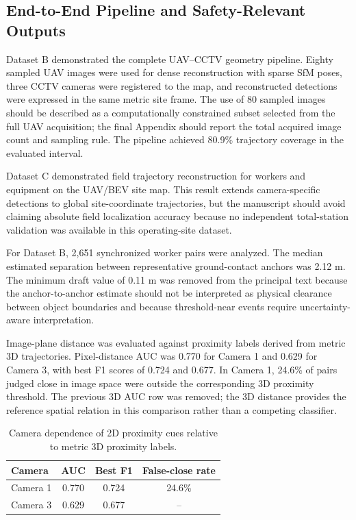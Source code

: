 \subsection{End-to-End Pipeline and Safety-Relevant Outputs}
Dataset B demonstrated the complete UAV--CCTV geometry pipeline. Eighty sampled UAV images were used for dense reconstruction with sparse SfM poses, three CCTV cameras were registered to the map, and reconstructed detections were expressed in the same metric site frame. The use of 80 sampled images should be described as a computationally constrained subset selected from the full UAV acquisition; the final Appendix should report the total acquired image count and sampling rule. The pipeline achieved 80.9\% trajectory coverage in the evaluated interval.

Dataset C demonstrated field trajectory reconstruction for workers and equipment on the UAV/BEV site map. This result extends camera-specific detections to global site-coordinate trajectories, but the manuscript should avoid claiming absolute field localization accuracy because no independent total-station validation was available in this operating-site dataset.

For Dataset B, 2,651 synchronized worker pairs were analyzed. The median estimated separation between representative ground-contact anchors was 2.12 m. The minimum draft value of 0.11 m was removed from the principal text because the anchor-to-anchor estimate should not be interpreted as physical clearance between object boundaries and because threshold-near events require uncertainty-aware interpretation.

Image-plane distance was evaluated against proximity labels derived from metric 3D trajectories. Pixel-distance AUC was 0.770 for Camera 1 and 0.629 for Camera 3, with best F1 scores of 0.724 and 0.677. In Camera 1, 24.6\% of pairs judged close in image space were outside the corresponding 3D proximity threshold. The previous 3D AUC row was removed; the 3D distance provides the reference spatial relation in this comparison rather than a competing classifier.

\begin{table}[t]
\centering
\caption{Camera dependence of 2D proximity cues relative to metric 3D proximity labels.}
\label{tab:proximity}
\begin{tabular}{lccc}
\toprule
Camera & AUC & Best F1 & False-close rate \\
\midrule
Camera 1 & 0.770 & 0.724 & 24.6\% \\
Camera 3 & 0.629 & 0.677 & -- \\
\bottomrule
\end{tabular}
\end{table}
